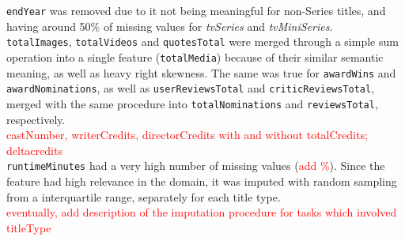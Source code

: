 \texttt{endYear} was removed due to it not being meaningful for
non-Series titles, and having around 50\% of missing values for \textit{tvSeries} and
\textit{tvMiniSeries}.\\
\texttt{totalImages}, \texttt{totalVideos} and \texttt{quotesTotal} were merged
through a simple sum operation
into a single feature (\texttt{totalMedia}) because of their similar semantic
meaning, as well as heavy right skewness. The same was true for \texttt{awardWins}
and \texttt{awardNominations}, as well as \texttt{userReviewsTotal} and
\texttt{criticReviewsTotal}, merged with the same procedure into
\texttt{totalNominations} and \texttt{reviewsTotal}, respectively.\\
\textcolor{red}{castNumber, writerCredits, directorCredits with and without
totalCredits; deltacredits}\\
\texttt{runtimeMinutes} had a very high number of missing values (\textcolor{red}{add
\%}). Since the feature had high relevance in the domain, it was
imputed with random sampling from a interquartile range, separately for each title
type.\\
\textcolor{red}{eventually, add description of the imputation procedure for
tasks which involved titleType}